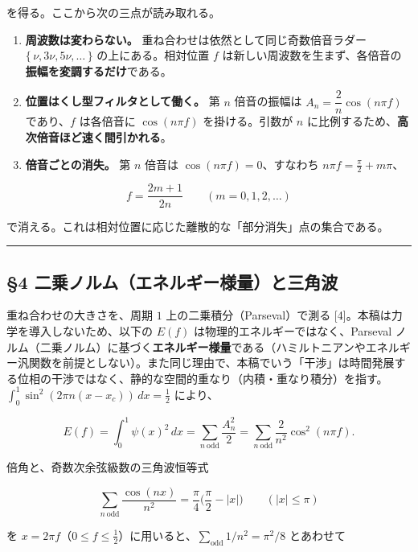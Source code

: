 \documentclass[
]{ltjsarticle}
\begin{document}
を得る。ここから次の三点が読み取れる。

\begin{enumerate}
\def\labelenumi{\arabic{enumi}.}
\item
  \textbf{周波数は変わらない。} 重ね合わせは依然として同じ奇数倍音ラダー
  \(\{\,\nu,3\nu,5\nu,\dots\,\}\) の上にある。相対位置 \(f\)
  は新しい周波数を生まず、各倍音の\textbf{振幅を変調するだけ}である。
\item
  \textbf{位置はくし型フィルタとして働く。} 第 \(n\) 倍音の振幅は
  \(A_n=\dfrac{2}{n}\cos(n\pi f)\) であり、\(f\) は各倍音に
  \(\cos(n\pi f)\) を掛ける。引数が \(n\)
  に比例するため、\textbf{高次倍音ほど速く間引かれる}。
\item
  \textbf{倍音ごとの消失。} 第 \(n\) 倍音は \(\cos(n\pi f)=0\)、すなわち
  \(n\pi f=\tfrac{\pi}{2}+m\pi\)、
\end{enumerate}

\[f=\frac{2m+1}{2n}\qquad(m=0,1,2,\dots)\]

で消える。これは相対位置に応じた離散的な「部分消失」点の集合である。

\begin{center}\rule{0.5\linewidth}{0.5pt}\end{center}

\subsection{§4
二乗ノルム（エネルギー様量）と三角波}\label{ux4e8cux4e57ux30ceux30ebux30e0ux30a8ux30cdux30ebux30aeux30fcux69d8ux91cfux3068ux4e09ux89d2ux6ce2}

重ね合わせの大きさを、周期 \(1\) 上の二乗積分（Parseval）で測る
{[}4{]}。本稿は力学を導入しないため、以下の \(E(f)\)
は物理的エネルギーではなく、Parseval
ノルム（二乗ノルム）に基づく\textbf{エネルギー様量}である（ハミルトニアンやエネルギー汎関数を前提としない）。また同じ理由で、本稿でいう「干渉」は時間発展する位相の干渉ではなく、静的な空間的重なり（内積・重なり積分）を指す。\(\int_0^1\sin^2(2\pi n(x-x_c))\,dx=\tfrac12\)
により、

\[E(f)=\int_0^1\psi(x)^2\,dx=\sum_{n\ \mathrm{odd}}\frac{A_n^2}{2}=\sum_{n\ \mathrm{odd}}\frac{2}{n^2}\cos^2(n\pi f).\]

倍角と、奇数次余弦級数の三角波恒等式

\[\sum_{n\ \mathrm{odd}}\frac{\cos(nx)}{n^2}=\frac{\pi}{4}\Big(\frac{\pi}{2}-|x|\Big)\qquad(|x|\le\pi)\]

を
\(x=2\pi f\)（\(0\le f\le\tfrac12\)）に用いると、\(\sum_{\mathrm{odd}}1/n^2=\pi^2/8\)
とあわせて
\end{document}
